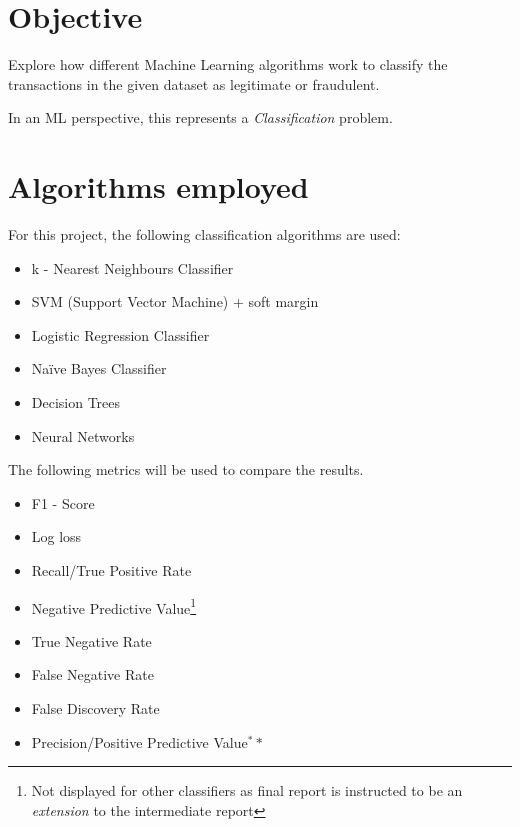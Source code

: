 \documentclass[letterpaper, 11 pt, conference]{ieeeconf}  %
\begin{document}
\section{Objective}
Explore how different Machine Learning algorithms work to classify the transactions in the given dataset as legitimate or fraudulent.

In an ML perspective, this represents a \emph{Classification} problem.

\section*{Algorithms employed}
\noindent For this project, the following classification algorithms are used:
\begin{itemize}
    \item k - Nearest Neighbours Classifier
    \item SVM (Support Vector Machine) + soft margin
    \item Logistic Regression Classifier
    \item Na\"ive Bayes Classifier%
    \item Decision Trees%
    \item Neural Networks%
\end{itemize}
The following metrics will be used to compare the results. 
\begin{itemize}
    \item F1 - Score
    \item Log loss
    \item Recall/True Positive Rate
	\item Negative Predictive Value\footnote{\tiny Not displayed for other classifiers as final report is instructed to be an \textit{extension} to the intermediate report\label{key}}
    \item True Negative Rate
    \item False Negative Rate
    \item False Discovery Rate

    \item Precision/Positive Predictive Value$^**$
\end{itemize}
    
\end{document}
